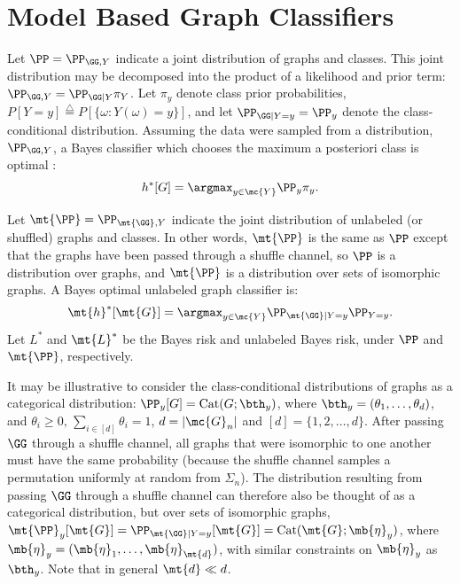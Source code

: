 \documentclass[10pt,journal,cspaper,compsoc]{IEEEtran}
\begin{document}
\section{Model Based Graph Classifiers} %
\label{sec:model_based_graph_classifiers}


Let $\PP=\PP_{\GG,Y}$ indicate a joint distribution of graphs and classes. This joint distribution may be decomposed into the product of a likelihood and prior term: $\PP_{\GG,Y} = \PP_{\GG|Y}\pi_Y$.  Let $\pi_y$ denote class prior probabilities, $P[Y=y]\overset{\triangle}{=}P[\{\omega: Y(\omega)=y\}]$, and let $\PP_{\GG | Y = y}=\PP_y$ denote the class-conditional distribution.  Assuming the data were sampled from a distribution, $\PP_{\GG,Y}$, a Bayes classifier which chooses the maximum a posteriori class is optimal \cite{DGL}:
\begin{align} \label{eq:bayes}
	 h^*[G] = \argmax_{y \in \mc{Y}} \PP_y \pi_{y}.
\end{align}

Let $\mt{\PP}=\PP_{\mt{\GG},Y}$ indicate the joint distribution of unlabeled (or shuffled) graphs and classes.  In other words, $\mt{\PP}$ is the same as $\PP$ except that the graphs have been passed through a shuffle channel, so $\PP$ is a distribution over graphs, and $\mt{\PP}$ is a distribution over sets of isomorphic graphs.  A Bayes optimal unlabeled graph classifier is:
\begin{align} \label{eq:unbayes}
	 \mt{h}^*[\mt{G}] = \argmax_{y \in \mc{Y}} \PP_{\mt{\GG} | Y=y} \PP_{Y=y}.
\end{align}
Let $L^*$ and $\mt{L}^*$ be the Bayes risk and unlabeled Bayes risk, under $\PP$ and $\mt{\PP}$, respectively.

It may be illustrative to consider the class-conditional distributions of graphs as a categorical distribution: $\PP_{y}[G]=\text{Cat}(G; \bth_y)$, where $\bth_y=(\theta_1,\ldots, \theta_{d})$, and $\theta_i\geq 0, \, \sum_{i \in [d]} \theta_i=1$, $d=|\mc{G}_n|$ and $[d]=\{1,2,\ldots,d\}$. After passing $\GG$ through a shuffle channel, all graphs that were isomorphic to one another must have the same probability (because the shuffle channel samples a permutation uniformly at random from $\Sigma_n$).  The distribution resulting from passing $\GG$ through a shuffle channel can therefore also be thought of as a categorical distribution, but over sets of isomorphic graphs,  $\mt{\PP}_y[\mt{G}]=\PP_{\mt{\GG} | Y=y}[\mt{G}]=\text{Cat}(\mt{G}; \mb{\eta}_y)$, where $\mb{\eta}_y=(\mb{\eta}_1,\ldots, \mb{\eta}_{\mt{d}})$, with similar constraints on $\mb{\eta}_y$ as $\bth_y$.  Note that in general $\mt{d}\ll d$.  
\end{document}
